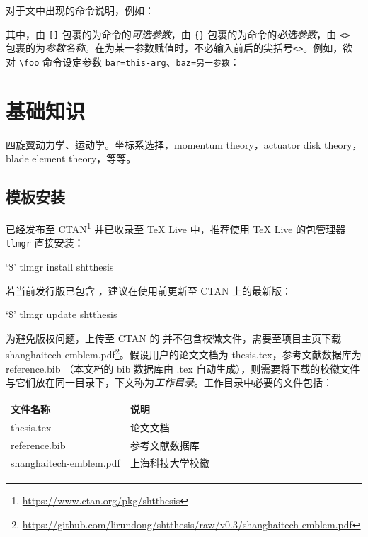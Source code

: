 \documentclass[master]{shtthesis}
\newcommand\prompt{\textup{\$}}
\begin{document}
对于文中出现的命令说明，例如：
\begin{latex}
\end{latex}
其中，由 \verb|[]| 包裹的为命令的\emph{可选参数}，由 \verb|{}| 包裹的为命令的\emph{必选参数}，由 \verb|<>| 包裹的为\emph{参数名称}。在为某一参数赋值时，不必输入前后的尖括号\verb|<>|。例如，欲对 \verb|\foo| 命令设定参数 \verb|bar=this-arg|、\verb|baz=另一参数|：
\begin{latex}
\end{latex}

\chapter{基础知识} %
四旋翼动力学、运动学。坐标系选择，momentum theory，actuator disk theory，blade element theory，等等。

\section{模板安装}
\shtthesis{} 已经发布至 CTAN\footnote{\url{https://www.ctan.org/pkg/shtthesis}} 并已收录至 \TeX{} Live 中，推荐使用 \TeX{} Live 的包管理器 \verb|tlmgr| 直接安装：
\begin{shell}
`\prompt' tlmgr install shtthesis
\end{shell}
若当前发行版已包含 \shtthesis{}，建议在使用前更新至 CTAN 上的最新版：
\begin{shell}
`\prompt' tlmgr update shtthesis
\end{shell}

为避免版权问题，上传至 CTAN 的 \shtthesis{} 并不包含校徽文件，需要至项目主页下载 shanghaitech-emblem.pdf\footnote{\url{https://github.com/lirundong/shtthesis/raw/v0.3/shanghaitech-emblem.pdf}}。假设用户的论文文档为 thesis.tex，参考文献数据库为 reference.bib （本文档的 bib 数据库由 \jobname.tex 自动生成），则需要将下载的校徽文件与它们放在同一目录下，下文称为\emph{工作目录}。工作目录中必要的文件包括：
\begin{center}
  \begin{tabular}{ll}
    \toprule
    文件名称 & 说明 \\
    \midrule 
    thesis.tex & 论文文档 \\
    reference.bib & 参考文献数据库 \\
    shanghaitech-emblem.pdf & 上海科技大学校徽 \\
    \bottomrule
  \end{tabular}
\end{center}
\end{document}
